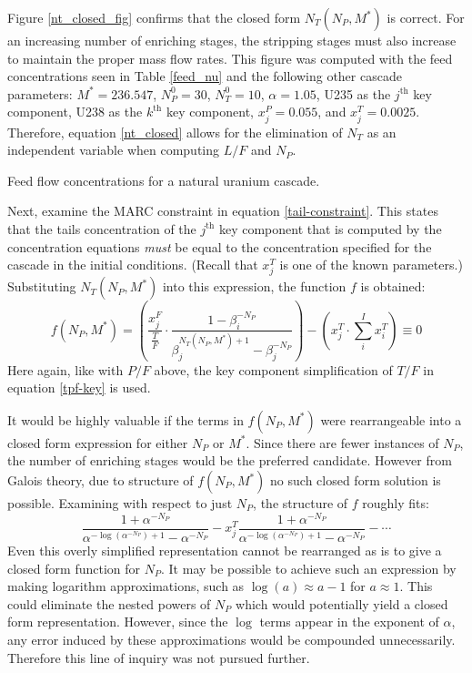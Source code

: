 \documentclass{ansconf}
\newcommand{\nuc}[2]{{#1}{#2}}
\newcommand{\jth}[0]{$j^{\mbox{th}}$ }
\newcommand{\kth}[0]{$k^{\mbox{th}}$ }
\begin{document}
Figure \ref{nt_closed_fig} confirms that the closed form $N_T(N_P, M^*)$ is correct.
For an increasing number of enriching stages, the stripping stages must also 
increase to maintain the proper mass flow rates.
This figure was computed 
with the feed concentrations seen in Table \ref{feed_nu} and the following other 
cascade parameters: $M^*=236.547$, $N_P^0=30$, $N_T^0=10$, $\alpha=1.05$, 
\nuc{U}{235} as the \jth key component, \nuc{U}{238} as the \kth key component, 
$x_j^P=0.055$, and $x_j^T=0.0025$.
Therefore, equation \ref{nt_closed} allows for the elimination of $N_T$ as an 
independent variable when computing $L/F$ and $N_P$.  

\begin{table}[htbp]
\begin{center}
\caption{Feed flow concentrations for a natural uranium cascade.}

\label{feed_nu}
\end{center}
\end{table}

Next, examine the MARC constraint in equation \ref{tail-constraint}.  This states that
the tails concentration of the \jth key component that is computed by the concentration
equations \emph{must} be equal to the concentration specified for the cascade in the
initial conditions.  (Recall that $x_j^T$ is one of the known parameters.)  
Substituting $N_T(N_P, M^*)$ into this expression, the function $f$ is obtained:
\begin{equation}
f(N_P,M^*) =
\left(\frac{x_j^F}{\frac{T}{F}} \cdot \frac{1 - \beta_i^{-N_P}}
                                           {\beta_j^{N_T(N_P,M^*)+1} - \beta_j^{-N_P}} \right)
- \left(x_j^T\cdot\sum_i^{I} x_i^T\right) \equiv 0
\end{equation}
Here again, like with $P/F$ above, the key component simplification of $T/F$ in 
equation \ref{tpf-key} is used.

It would be highly valuable if the terms in $f(N_P,M^*)$ were rearrangeable into 
a closed form expression
for either $N_P$ or $M^*$.  Since there are fewer instances of $N_P$, the number of
enriching stages would be the preferred candidate.  However from Galois theory, 
due to structure of $f(N_P,M^*)$ no such closed form solution is possible.  Examining
with respect to just $N_P$, the structure of $f$ roughly fits:
\begin{equation}
\frac{1 + \alpha^{-N_P}}{\alpha^{-\log(\alpha^{-N_P})+1} - \alpha^{-N_P}} - x_j^T
    \frac{1 + \alpha^{-N_P}}{\alpha^{-\log(\alpha^{-N_P})+1} - \alpha^{-N_P}} -
    \cdots 
\end{equation}
Even this overly simplified representation cannot be rearranged as is to give a 
closed form function for $N_P$.  It may be possible to achieve such an expression 
by making logarithm approximations, such as $\log(a) \approx a - 1$ for $a\approx1$.  
This could 
eliminate the nested powers of $N_P$ which would potentially yield
a closed form representation.  However, since the $\log$ terms appear in the exponent
of $\alpha$, any error induced by these approximations would be compounded 
unnecessarily.  Therefore this line of inquiry was not pursued further.
\end{document}
